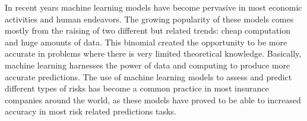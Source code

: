 \documentclass[parskip=full]{scrartcl}
\begin{document}
In recent years machine learning models have become pervasive in most economic
activities and human endeavors. The growing popularity of these models comes
mostly from the raising of two different but related trends: cheap computation
and huge amounts of data. This binomial created the opportunity to be more
accurate in problems where there is very limited theoretical knowledge.
Basically, machine learning harnesses the power of data and computing to produce
more accurate predictions. The use of machine learning models to assess and
predict different types of risks has become a common practice in most insurance
companies around the world, as these models have proved to be able to increased
accuracy in most risk related predictions tasks.



\end{document}
